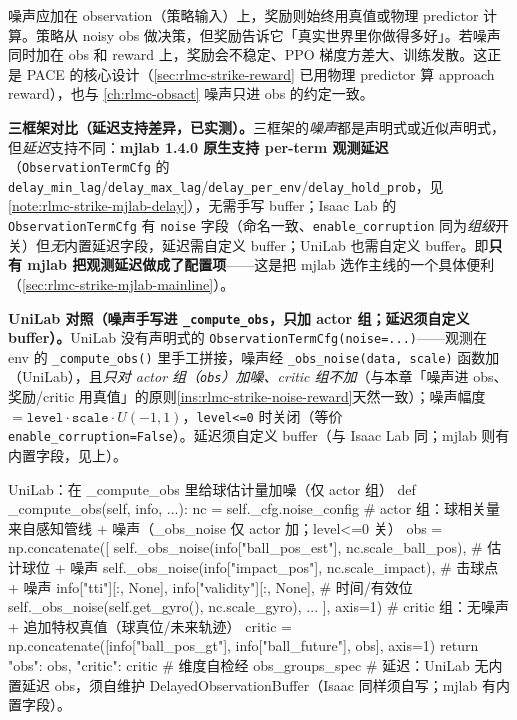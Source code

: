 \begin{insight}\label{ins:rlmc-strike-noise-reward}
噪声应加在 observation（策略输入）上，奖励则始终用真值或物理 predictor 计算。策略从 noisy obs 做决策，但奖励告诉它「真实世界里你做得多好」。若噪声同时加在 obs 和 reward 上，奖励会不稳定、PPO 梯度方差大、训练发散。这正是 PACE 的核心设计（\cref{sec:rlmc-strike-reward} 已用物理 predictor 算 approach reward），也与 \cref{ch:rlmc-obsact} 噪声只进 obs 的约定一致。
\end{insight}

\textbf{三框架对比（延迟支持差异，已实测）。}三框架的\emph{噪声}都是声明式或近似声明式，但\emph{延迟}支持不同：\textbf{mjlab 1.4.0 原生支持 per-term 观测延迟}（\verb|ObservationTermCfg| 的 \verb|delay_min_lag|/\verb|delay_max_lag|/\verb|delay_per_env|/\verb|delay_hold_prob|，见 \cref{note:rlmc-strike-mjlab-delay}），无需手写 buffer；Isaac Lab 的 \verb|ObservationTermCfg| 有 \verb|noise| 字段（命名一致、\verb|enable_corruption| 同为\emph{组级}开关）但\emph{无}内置延迟字段，延迟需自定义 buffer；UniLab 也需自定义 buffer。即\textbf{只有 mjlab 把观测延迟做成了配置项}——这是把 mjlab 选作主线的一个具体便利（\cref{sec:rlmc-strike-mjlab-mainline}）。

\textbf{UniLab 对照（噪声手写进 \texttt{\_compute\_obs}，只加 actor 组；延迟须自定义 buffer）。}UniLab 没有声明式的 \verb|ObservationTermCfg(noise=...)|——观测在 env 的 \verb|_compute_obs()| 里手工拼接，噪声经 \verb|_obs_noise(data, scale)| 函数加（UniLab），且\emph{只对 actor 组（\texttt{obs}）加噪、critic 组不加}（与本章「噪声进 obs、奖励/critic 用真值」的原则\cref{ins:rlmc-strike-noise-reward}天然一致）；噪声幅度 $=\texttt{level}\cdot\texttt{scale}\cdot U(-1,1)$，\verb|level<=0| 时关闭（等价 \verb|enable_corruption=False|）。延迟须自定义 buffer（与 Isaac Lab 同；mjlab 则有内置字段，见上）。

\begin{codebox}[Python]{UniLab：在 \_compute\_obs 里给球估计量加噪（仅 actor 组）}
def _compute_obs(self, info, ...):
    nc = self._cfg.noise_config
    # actor 组：球相关量来自感知管线 + 噪声（_obs_noise 仅 actor 加；level<=0 关）
    obs = np.concatenate([
        self._obs_noise(info["ball_pos_est"], nc.scale_ball_pos),   # 估计球位 + 噪声
        self._obs_noise(info["impact_pos"],  nc.scale_impact),      # 击球点 + 噪声
        info["tti"][:, None], info["validity"][:, None],            # 时间/有效位
        self._obs_noise(self.get_gyro(), nc.scale_gyro), ...
    ], axis=1)
    # critic 组：无噪声 + 追加特权真值（球真位/未来轨迹）
    critic = np.concatenate([info["ball_pos_gt"], info["ball_future"], obs], axis=1)
    return {"obs": obs, "critic": critic}      # 维度自检经 obs_groups_spec
# 延迟：UniLab 无内置延迟 obs，须自维护 DelayedObservationBuffer（Isaac 同样须自写；mjlab 有内置字段）。
\end{codebox}

